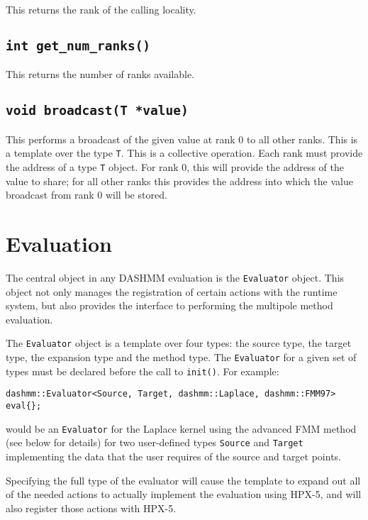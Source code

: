 \documentclass[11pt]{book}
\begin{document}
This returns the rank of the calling locality.

\subsection{{\tt int get\_num\_ranks()}}

This returns the number of ranks available.

\subsection{{\tt void broadcast(T *value)}}

This performs a broadcast of the given value at rank 0 to all other ranks.
This is a template over the type {\tt T}. This is a collective operation. Each
rank must provide the address of a type {\tt T} object. For rank 0, this will
provide  the address of the value to share; for all other ranks this provides
the address into which the value broadcast from rank 0 will be stored.

\section{Evaluation}

The central object in any DASHMM evaluation is the {\tt Evaluator} object. This
object not only manages the registration of certain actions with the runtime
system, but also provides the interface to performing the multipole method
evaluation.

The {\tt Evaluator} object is a template over four types: the source type, the
target type, the expansion type and the method type. The {\tt Evaluator} for a
given set of types must be declared before the call to {\tt init()}. For
example: 

\begin{verbatim}
dashmm::Evaluator<Source, Target, dashmm::Laplace, dashmm::FMM97> eval{};
\end{verbatim}

would be an {\tt Evaluator} for the Laplace kernel using the advanced FMM method
(see below for details) for two user-defined types {\tt Source} and {\tt Target}
implementing the data that the user requires of the source and target points. 

Specifying the full type of the evaluator will cause the template to expand
out all of the needed actions to actually implement the evaluation using
HPX-5, and will also register those actions with HPX-5.
\end{document}
